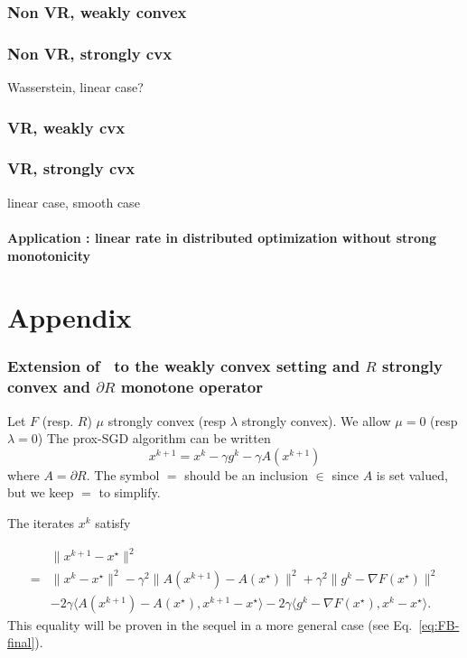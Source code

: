 \documentclass{article}
\newcommand{\ps}[1]{\langle #1 \rangle}
\theoremstyle{definition}
\begin{document}
\section{Non VR, weakly convex}

\section{Non VR, strongly cvx}

Wasserstein, linear case? 

\section{VR, weakly cvx}

\section{VR, strongly cvx}


linear case, smooth case
\subsection{Application : linear rate in distributed optimization without strong monotonicity}





\part{Appendix}


\section{Extension of~\cite{gorbunov2019unified} to the weakly convex setting and $R$ strongly convex and $\partial R$ monotone operator}
Let $F$ (resp. $R$) $\mu$ strongly convex (resp $\lambda$ strongly convex). We allow $\mu=0$ (resp $\lambda = 0$)  
The prox-SGD algorithm can be written
\begin{equation}
    x^{k+1} = x^k - \gamma g^k - \gamma A(x^{k+1})
\end{equation}
where $A = \partial R$. The symbol $=$ should be an inclusion $\in$ since $A$ is set valued, but we keep $=$ to simplify.

The iterates $x^k$ satisfy

\begin{align}
    \label{eq:PG-final}
    &\|x^{k+1} - x^\star\|^2 \\
    =& \|x^k - x^\star\|^2 -\gamma^2\|A(x^{k+1}) - A(x^\star)\|^2 + \gamma^2 \|g^k - \nabla F(x^\star) \|^2\\
    &- 2\gamma\ps{A(x^{k+1})-A(x^\star),x^{k+1}-x^\star} - 2\gamma\ps{g^k-\nabla F(x^\star),x^k-x^\star}.
\end{align}
This equality will be proven in the sequel in a more general case (see Eq.~\eqref{eq:FB-final}).
\end{document}
